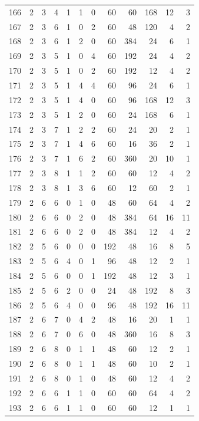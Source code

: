 \documentclass[11pt,a4paper]{article}
\begin{document}
\begin{longtable}{r|rrr|rrr|rrr|rr}
166 & 2 & 3 & 4 & 1 & 1 & 0 & 60 & 60 & 168 & 12 & 3\\
167 & 2 & 3 & 6 & 1 & 0 & 2 & 60 & 48 & 120 & 4 & 2\\
168 & 2 & 3 & 6 & 1 & 2 & 0 & 60 & 384 & 24 & 6 & 1\\
169 & 2 & 3 & 5 & 1 & 0 & 4 & 60 & 192 & 24 & 4 & 2\\
170 & 2 & 3 & 5 & 1 & 0 & 2 & 60 & 192 & 12 & 4 & 2\\
171 & 2 & 3 & 5 & 1 & 4 & 4 & 60 & 96 & 24 & 6 & 1\\
172 & 2 & 3 & 5 & 1 & 4 & 0 & 60 & 96 & 168 & 12 & 3\\
173 & 2 & 3 & 5 & 1 & 2 & 0 & 60 & 24 & 168 & 6 & 1\\
174 & 2 & 3 & 7 & 1 & 2 & 2 & 60 & 24 & 20 & 2 & 1\\
175 & 2 & 3 & 7 & 1 & 4 & 6 & 60 & 16 & 36 & 2 & 1\\
176 & 2 & 3 & 7 & 1 & 6 & 2 & 60 & 360 & 20 & 10 & 1\\
177 & 2 & 3 & 8 & 1 & 1 & 2 & 60 & 60 & 12 & 4 & 2\\
178 & 2 & 3 & 8 & 1 & 3 & 6 & 60 & 12 & 60 & 2 & 1\\
179 & 2 & 6 & 6 & 0 & 1 & 0 & 48 & 60 & 64 & 4 & 2\\
180 & 2 & 6 & 6 & 0 & 2 & 0 & 48 & 384 & 64 & 16 & 11\\
181 & 2 & 6 & 6 & 0 & 2 & 0 & 48 & 384 & 12 & 4 & 2\\
182 & 2 & 5 & 6 & 0 & 0 & 0 & 192 & 48 & 16 & 8 & 5\\
183 & 2 & 5 & 6 & 4 & 0 & 1 & 96 & 48 & 12 & 2 & 1\\
184 & 2 & 5 & 6 & 0 & 0 & 1 & 192 & 48 & 12 & 3 & 1\\
185 & 2 & 5 & 6 & 2 & 0 & 0 & 24 & 48 & 192 & 8 & 3\\
186 & 2 & 5 & 6 & 4 & 0 & 0 & 96 & 48 & 192 & 16 & 11\\
187 & 2 & 6 & 7 & 0 & 4 & 2 & 48 & 16 & 20 & 1 & 1\\
188 & 2 & 6 & 7 & 0 & 6 & 0 & 48 & 360 & 16 & 8 & 3\\
189 & 2 & 6 & 8 & 0 & 1 & 1 & 48 & 60 & 12 & 2 & 1\\
190 & 2 & 6 & 8 & 0 & 1 & 1 & 48 & 60 & 10 & 2 & 1\\
191 & 2 & 6 & 8 & 0 & 1 & 0 & 48 & 60 & 12 & 4 & 2\\
192 & 2 & 6 & 6 & 1 & 1 & 0 & 60 & 60 & 64 & 4 & 2\\
193 & 2 & 6 & 6 & 1 & 1 & 0 & 60 & 60 & 12 & 1 & 1\\

\end{longtable}
\end{document}
